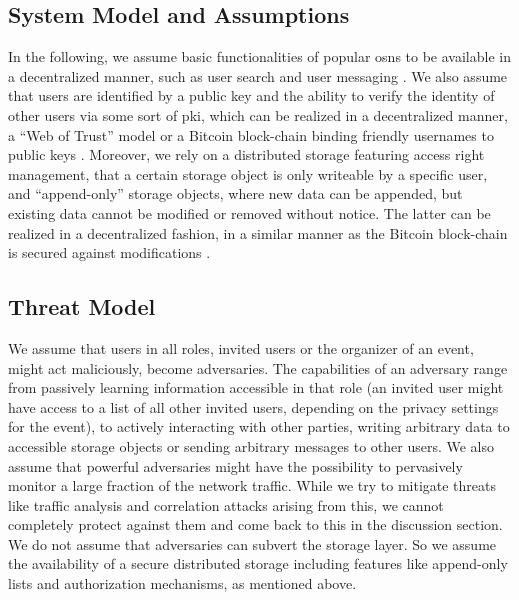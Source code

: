 \subsection{System Model and Assumptions}
	\label{subsection:event-invitations-dosns:system-model-and-assumptions}
In the following, we
assume basic functionalities of popular \Acp{osn} to be available in 
a decentralized manner, such as user 
search \cite{GreschbachKB2013} and user messaging \cite{RowstronD2001}.
%
We also assume that users are identified by a public key and the ability  
to verify the identity of other users via some sort of \Ac{pki}, which can 
be realized in a decentralized manner, \eg a ``Web of Trust'' model or a Bitcoin 
block-chain binding friendly usernames to public keys \cite{Freitas2013}. 
%
Moreover, we rely on a distributed storage
featuring access right management, \eg that a certain storage object is
only writeable by a specific user, and ``append-only'' storage objects,
where new data can be appended, but existing data cannot be modified or
removed without notice. The latter can be realized in a decentralized
fashion, \eg in a similar manner as the Bitcoin block-chain is secured
against modifications \cite{Nakamoto08}. 


\subsection{Threat Model}
	\label{subsection:event-invitations-dosns:threat-model}

We assume that users in all roles, \eg invited users or
the organizer of an event, might act maliciously, \ie become
adversaries. The capabilities of an adversary range from passively
learning information accessible in that role (\eg an invited
user might have access to a list of all other invited users, depending
on the privacy settings for the event), to actively interacting with
other parties, \eg writing arbitrary data to accessible storage
objects or sending arbitrary messages to other users. We also assume
that powerful adversaries might have the possibility to pervasively
monitor a large fraction of the network traffic. While we try to
mitigate threats like traffic analysis and correlation attacks arising
from this, we cannot completely protect against
them and come back to this in the discussion section. We do not assume
that adversaries can subvert the storage layer. So we
assume the availability of a secure distributed storage including
features like append-only lists and authorization mechanisms, as
mentioned above. %

